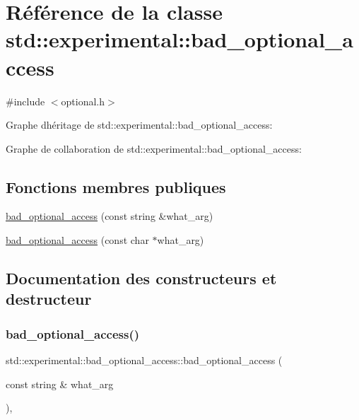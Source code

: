 \hypertarget{classstd_1_1experimental_1_1bad__optional__access}{}\section{Référence de la classe std\+:\+:experimental\+:\+:bad\+\_\+optional\+\_\+access}
\label{classstd_1_1experimental_1_1bad__optional__access}


{\ttfamily \#include $<$optional.\+h$>$}



Graphe d\textquotesingle{}héritage de std\+:\+:experimental\+:\+:bad\+\_\+optional\+\_\+access\+:


Graphe de collaboration de std\+:\+:experimental\+:\+:bad\+\_\+optional\+\_\+access\+:
\subsection*{Fonctions membres publiques}
\begin{DoxyCompactItemize}
\item 
\hyperlink{classstd_1_1experimental_1_1bad__optional__access_a5788e13d3c7419ab5e781274e102d0f2}{bad\+\_\+optional\+\_\+access} (const string \&what\+\_\+arg)
\item 
\hyperlink{classstd_1_1experimental_1_1bad__optional__access_a75d7625c06d41839667c6cc9ce144bd1}{bad\+\_\+optional\+\_\+access} (const char $\ast$what\+\_\+arg)
\end{DoxyCompactItemize}


\subsection{Documentation des constructeurs et destructeur}
\mbox{\label{classstd_1_1experimental_1_1bad__optional__access_a5788e13d3c7419ab5e781274e102d0f2}} 
\subsubsection{\texorpdfstring{bad\+\_\+optional\+\_\+access()}{bad\_optional\_access()}\hspace{0.1cm}{\footnotesize\ttfamily [1/2]}}
{\footnotesize\ttfamily std\+::experimental\+::bad\+\_\+optional\+\_\+access\+::bad\+\_\+optional\+\_\+access (\begin{DoxyParamCaption}\item[{const string \&}]{what\+\_\+arg }\end{DoxyParamCaption})\hspace{0.3cm}{\ttfamily [inline]}, {\ttfamily [explicit]}}

